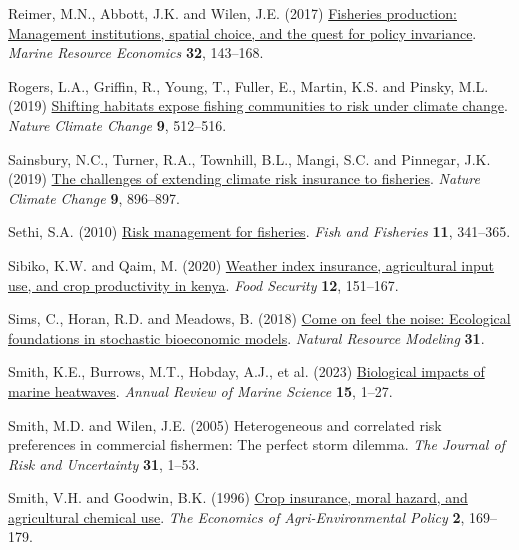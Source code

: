 \documentclass[
  letterpaper,
  DIV=11,
  numbers=noendperiod]{scrartcl}
\newlength{\cslhangindent}
\newlength{\cslentryspacingunit} %
\newenvironment{CSLReferences}[2] %
 {%
  \setlength{\parindent}{0pt}
  \ifodd #1
  \let\oldpar\par
  \def\par{\hangindent=\cslhangindent\oldpar}
  \fi
  \setlength{\parskip}{#2\cslentryspacingunit}
 }%
 {}
\theoremstyle{plain}
\theoremstyle{plain}
\theoremstyle{remark}
\begin{document}
\begin{CSLReferences}{1}{0}
\leavevmode{}%
Reimer, M.N., Abbott, J.K. and Wilen, J.E. (2017)
\href{https://doi.org/10.1086/690678}{Fisheries production: Management
institutions, spatial choice, and the quest for policy invariance}.
\emph{Marine Resource Economics} \textbf{32}, 143--168.

\leavevmode{}%
Rogers, L.A., Griffin, R., Young, T., Fuller, E., Martin, K.S. and
Pinsky, M.L. (2019)
\href{https://doi.org/10.1038/s41558-019-0503-z}{Shifting habitats
expose fishing communities to risk under climate change}. \emph{Nature
Climate Change} \textbf{9}, 512--516.

\leavevmode{}%
Sainsbury, N.C., Turner, R.A., Townhill, B.L., Mangi, S.C. and Pinnegar,
J.K. (2019) \href{https://doi.org/10.1038/s41558-019-0645-z}{The
challenges of extending climate risk insurance to fisheries}.
\emph{Nature Climate Change} \textbf{9}, 896--897.

\leavevmode{}%
Sethi, S.A. (2010)
\href{https://doi.org/10.1111/j.1467-2979.2010.00363.x}{Risk management
for fisheries}. \emph{Fish and Fisheries} \textbf{11}, 341--365.

\leavevmode{}%
Sibiko, K.W. and Qaim, M. (2020)
\href{https://doi.org/10.1007/s12571-019-00987-y}{Weather index
insurance, agricultural input use, and crop productivity in kenya}.
\emph{Food Security} \textbf{12}, 151--167.

\leavevmode{}%
Sims, C., Horan, R.D. and Meadows, B. (2018)
\href{https://doi.org/10.1111/NRM.12191}{Come on feel the noise:
Ecological foundations in stochastic bioeconomic models}. \emph{Natural
Resource Modeling} \textbf{31}.

\leavevmode{}%
Smith, K.E., Burrows, M.T., Hobday, A.J., et al. (2023)
\href{https://doi.org/10.1146/annurev-marine-032122-121437}{Biological
impacts of marine heatwaves}. \emph{Annual Review of Marine Science}
\textbf{15}, 1--27.

\leavevmode{}%
Smith, M.D. and Wilen, J.E. (2005) Heterogeneous and correlated risk
preferences in commercial fishermen: The perfect storm dilemma.
\emph{The Journal of Risk and Uncertainty} \textbf{31}, 1--53.

\leavevmode{}%
Smith, V.H. and Goodwin, B.K. (1996)
\href{https://doi.org/10.2307/1243714}{Crop insurance, moral hazard, and
agricultural chemical use}. \emph{The Economics of Agri-Environmental
Policy} \textbf{2}, 169--179.


\end{CSLReferences}
\end{document}
